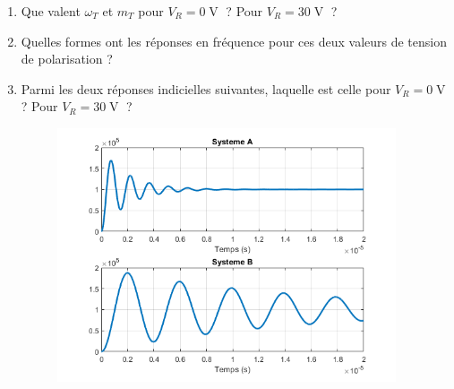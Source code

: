 \begin{enumerate}
	\item Que valent $\omega_T$ et $m_T$ pour $V_R = 0\operatorname{V}$ ? Pour $V_R = 30\operatorname{V}$ ?	
	\item Quelles formes ont les réponses en fréquence pour ces deux valeurs de tension de polarisation ?
	\item Parmi les deux réponses indicielles suivantes, laquelle est celle pour $V_R = 0\operatorname{V}$ ? Pour $V_R = 30\operatorname{V}$ ?
\begin{figure}[!h]
	\centering
	\includegraphics[width=10cm]{images/TD/step_sys.png}
\end{figure}
\end{enumerate}

